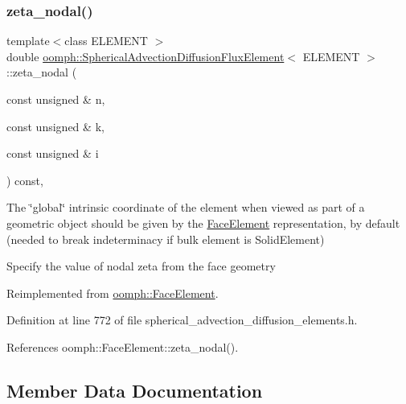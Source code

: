 \mbox{\label{classoomph_1_1SphericalAdvectionDiffusionFluxElement_ab7dc1526807ada4b9189526b69653c91}} 
\subsubsection{\texorpdfstring{zeta\+\_\+nodal()}{zeta\_nodal()}}
{\footnotesize\ttfamily template$<$class E\+L\+E\+M\+E\+NT $>$ \\
double \hyperlink{classoomph_1_1SphericalAdvectionDiffusionFluxElement}{oomph\+::\+Spherical\+Advection\+Diffusion\+Flux\+Element}$<$ E\+L\+E\+M\+E\+NT $>$\+::zeta\+\_\+nodal (\begin{DoxyParamCaption}\item[{const unsigned \&}]{n,  }\item[{const unsigned \&}]{k,  }\item[{const unsigned \&}]{i }\end{DoxyParamCaption}) const\hspace{0.3cm}{\ttfamily [inline]}, {\ttfamily [virtual]}}



The \char`\"{}global\char`\"{} intrinsic coordinate of the element when viewed as part of a geometric object should be given by the \hyperlink{classoomph_1_1FaceElement}{Face\+Element} representation, by default (needed to break indeterminacy if bulk element is Solid\+Element) 

Specify the value of nodal zeta from the face geometry 

Reimplemented from \hyperlink{classoomph_1_1FaceElement_a58c9f93705c7741f76c8487d152e68a6}{oomph\+::\+Face\+Element}.



Definition at line 772 of file spherical\+\_\+advection\+\_\+diffusion\+\_\+elements.\+h.



References oomph\+::\+Face\+Element\+::zeta\+\_\+nodal().



\subsection{Member Data Documentation}
\mbox{\label{classoomph_1_1SphericalAdvectionDiffusionFluxElement_a0d9b714320a27d346fa8d0ccc1ef4148}} 
